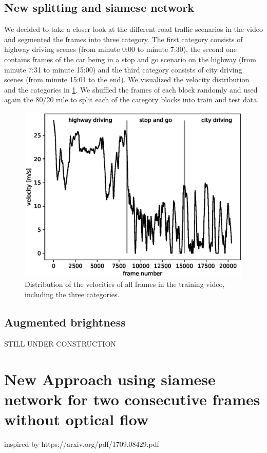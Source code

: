 \documentclass[conference]{IEEEtran}
\begin{document}
\subsection{New splitting and siamese network}
We decided to take a closer look at the different road traffic scenarios in the video and segmented the 
frames into three category. The first category
consists of highway driving scenes (from minute 0:00 to minute 7:30), the second one contains frames of 
the car being
in a stop and go scenario on the highway (from minute 7:31 to minute 15:00) and the third category 
consists of
city driving scenes (from minute 15:01 to the end). We visualized the velocity distribution and the 
categories in 
\cref{fig:SpeedPerFrameDistributionNewSplitting}. 
We shuffled the frames of each block randomly and used again the 80/20 rule to split each of the 
category blocks into train and test data.
\begin{figure}[h]
\centering
\includegraphics[scale=0.6]{./imgs/plot_speed_time_new_splitting.eps}
\caption{Distribution of the velocities of all frames in the training video, including the three categories.}
\label{fig:SpeedPerFrameDistributionNewSplitting}
\end{figure}
\subsection{Augmented brightness}
STILL UNDER CONSTRUCTION

\section{New Approach using siamese network for two consecutive frames without optical flow}
inspired by https://arxiv.org/pdf/1709.08429.pdf
\end{document}
